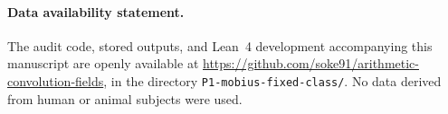 \documentclass[11pt,a4paper]{article}
\theoremstyle{plain}
\theoremstyle{definition}
\theoremstyle{remark}
\begin{document}
\paragraph{Data availability statement.} The audit code, stored outputs, and Lean~4 development accompanying this
manuscript are openly available at
\url{https://github.com/soke91/arithmetic-convolution-fields}, in the
directory \texttt{P1-mobius-fixed-class/}. No data derived from human or
animal subjects were used.

\end{document}
